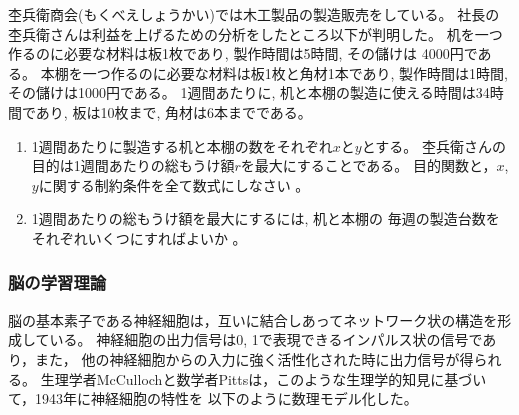 \documentclass[twocolumn,11pt]{jarticle}
\begin{document}
\nquestion
杢兵衛商会(もくべえしょうかい)では木工製品の製造販売をしている。
社長の杢兵衛さんは利益を上げるための分析をしたところ以下が判明した。
机を一つ作るのに必要な材料は板1枚であり, 製作時間は5時間, その儲けは
4000円である。
本棚を一つ作るのに必要な材料は板1枚と角材1本であり, 製作時間は1時間,
その儲けは1000円である。
1週間あたりに, 机と本棚の製造に使える時間は34時間であり, 板は10枚まで,
角材は6本までである。
\begin{enumerate}
\item 1週間あたりに製造する机と本棚の数をそれぞれ$x$と$y$とする。
杢兵衛さんの目的は1週間あたりの総もうけ額$r$を最大にすることである。
目的関数と，$x$, $y$に関する制約条件を全て数式にしなさい
。
\item 1週間あたりの総もうけ額を最大にするには, 机と本棚の
  毎週の製造台数をそれぞれいくつにすればよいか
  。
\end{enumerate}

\subsubsection{脳の学習理論}

脳の基本素子である神経細胞は，互いに結合しあってネットワーク状の構造を形成している。
神経細胞の出力信号は0, 1で表現できるインパルス状の信号であり，また，
他の神経細胞からの入力に強く活性化された時に出力信号が得られる。
生理学者McCullochと数学者Pittsは，このような生理学的知見に基づいて，1943年に神経細胞の特性を
以下のように数理モデル化した。
\end{document}
